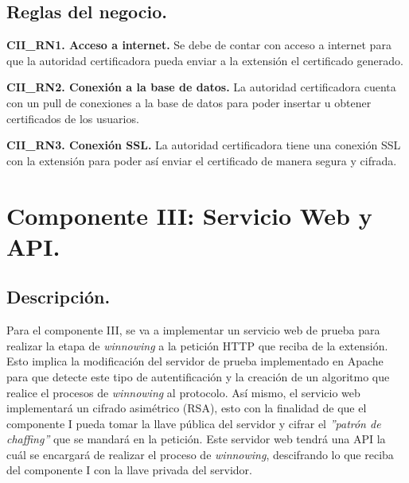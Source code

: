 \documentclass[12pt, a4paper, titlepage]{report}
\begin{document}
	            
	        \subsection{Reglas del negocio.}
	        
	        \textbf{CII\_RN1. Acceso a internet.} Se debe de contar con acceso a internet para que la autoridad certificadora pueda enviar a la extensión el certificado generado.\\
            \label{CII_RN1}
            
            \textbf{CII\_RN2. Conexión a la base de datos.} La autoridad certificadora cuenta con un pull de conexiones a la base de datos para poder insertar u obtener certificados de los usuarios.\\
            \label{CII_RN2}
            
            \textbf{CII\_RN3. Conexión SSL.} La autoridad certificadora tiene una conexión SSL con la extensión para poder así enviar el certificado de manera segura y cifrada.\\
            \label{CII_RN3}
			
	       
	       \section{Componente III: Servicio Web y API.}
	        \subsection{Descripción.}
	        Para el componente III, se va a implementar un servicio web de prueba para realizar la etapa de \textit{winnowing} a la petición HTTP que reciba de la extensión. Esto implica la modificación del servidor de prueba implementado en Apache para que detecte este tipo de autentificación y la creación de un algoritmo que realice el procesos de \textit{winnowing} al protocolo. 
	        Así mismo, el servicio web implementará un cifrado asimétrico (RSA), esto con la finalidad de que el componente I pueda tomar la llave pública del servidor y cifrar el \textit{''patrón de chaffing''} que se mandará en la petición. Este servidor web tendrá una API la cuál se encargará de realizar el proceso de \textit{winnowing}, descifrando lo que reciba del componente I con la llave privada del servidor.\\
            
\end{document}
